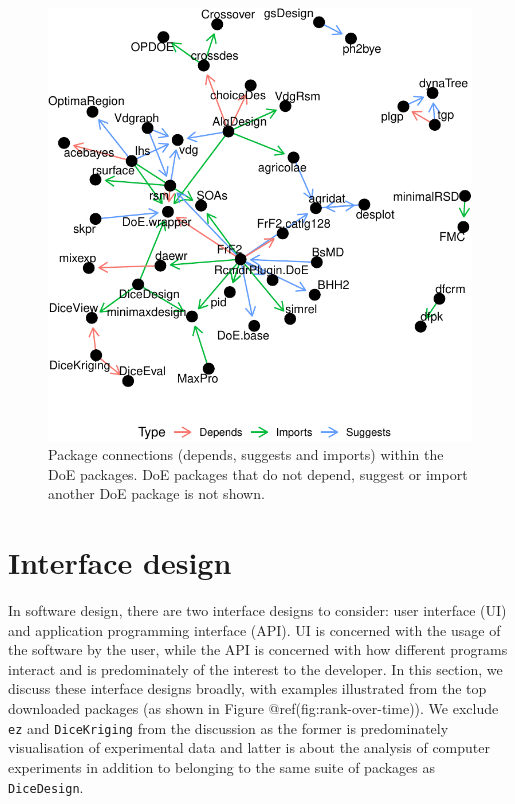 \documentclass{article}
\begin{document}
\begin{figure}[htbp]

{\centering \includegraphics{figures/plot-doe-network-1} 

}

\caption{Package connections (depends, suggests and imports) within the DoE packages. DoE packages that do not depend, suggest or import another DoE package is not shown.}\label{fig:plot-doe-network}
\end{figure}

\hypertarget{design}{%
\section{Interface design}\label{design}}

In software design, there are two interface designs to consider: user
interface (UI) and application programming interface (API). UI is
concerned with the usage of the software by the user, while the API is
concerned with how different programs interact and is predominately of
the interest to the developer. In this section, we discuss these
interface designs broadly, with examples illustrated from the top
downloaded packages (as shown in Figure @ref(fig:rank-over-time)). We
exclude \texttt{ez} and \texttt{DiceKriging} from the discussion as the
former is predominately visualisation of experimental data and latter is
about the analysis of computer experiments in addition to belonging to
the same suite of packages as \texttt{DiceDesign}.
\end{document}
